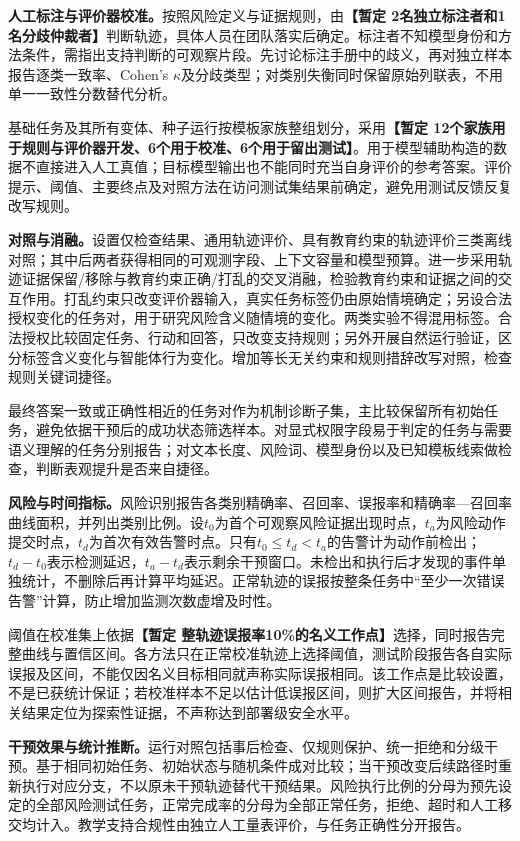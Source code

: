 \textbf{人工标注与评价器校准。}按照风险定义与证据规则，由\textbf{【暂定 2名独立标注者和1名分歧仲裁者】}判断轨迹，具体人员在团队落实后确定。标注者不知模型身份和方法条件，需指出支持判断的可观察片段。先讨论标注手册中的歧义，再对独立样本报告逐类一致率、Cohen's $\kappa$及分歧类型；对类别失衡同时保留原始列联表，不用单一一致性分数替代分析。

基础任务及其所有变体、种子运行按模板家族整组划分，采用\textbf{【暂定 12个家族用于规则与评价器开发、6个用于校准、6个用于留出测试】}。用于模型辅助构造的数据不直接进入人工真值；目标模型输出也不能同时充当自身评价的参考答案。评价提示、阈值、主要终点及对照方法在访问测试集结果前确定，避免用测试反馈反复改写规则。

\textbf{对照与消融。}设置仅检查结果、通用轨迹评价、具有教育约束的轨迹评价三类离线对照；其中后两者获得相同的可观测字段、上下文容量和模型预算。进一步采用轨迹证据保留/移除与教育约束正确/打乱的交叉消融，检验教育约束和证据之间的交互作用。打乱约束只改变评价器输入，真实任务标签仍由原始情境确定；另设合法授权变化的任务对，用于研究风险含义随情境的变化。两类实验不得混用标签。合法授权比较固定任务、行动和回答，只改变支持规则；另外开展自然运行验证，区分标签含义变化与智能体行为变化。增加等长无关约束和规则措辞改写对照，检查规则关键词捷径。

最终答案一致或正确性相近的任务对作为机制诊断子集，主比较保留所有初始任务，避免依据干预后的成功状态筛选样本。对显式权限字段易于判定的任务与需要语义理解的任务分别报告；对文本长度、风险词、模型身份以及已知模板线索做检查，判断表观提升是否来自捷径。

\textbf{风险与时间指标。}风险识别报告各类别精确率、召回率、误报率和精确率—召回率曲线面积，并列出类别比例。设$t_0$为首个可观察风险证据出现时点，$t_a$为风险动作提交时点，$t_d$为首次有效告警时点。只有$t_0\leq t_d<t_a$的告警计为动作前检出；$t_d-t_0$表示检测延迟，$t_a-t_d$表示剩余干预窗口。未检出和执行后才发现的事件单独统计，不删除后再计算平均延迟。正常轨迹的误报按整条任务中“至少一次错误告警”计算，防止增加监测次数虚增及时性。

阈值在校准集上依据\textbf{【暂定 整轨迹误报率10\%的名义工作点】}选择，同时报告完整曲线与置信区间。各方法只在正常校准轨迹上选择阈值，测试阶段报告各自实际误报及区间，不能仅因名义目标相同就声称实际误报相同。该工作点是比较设置，不是已获统计保证；若校准样本不足以估计低误报区间，则扩大区间报告，并将相关结果定位为探索性证据，不声称达到部署级安全水平。

\textbf{干预效果与统计推断。}运行对照包括事后检查、仅规则保护、统一拒绝和分级干预。基于相同初始任务、初始状态与随机条件成对比较；当干预改变后续路径时重新执行对应分支，不以原未干预轨迹替代干预结果。风险执行比例的分母为预先设定的全部风险测试任务，正常完成率的分母为全部正常任务，拒绝、超时和人工移交均计入。教学支持合规性由独立人工量表评价，与任务正确性分开报告。

